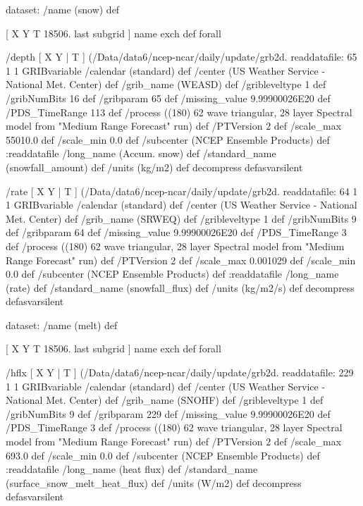 \begin{ingrid}
  dataset: /name (snow) def

   [ X Y T 18506. last subgrid ] { name exch def } forall

    /depth { [ X Y | T ] (/Data/data6/ncep-ncar/daily/update/grb2d.%
    readdatafile:
    65 1 1 GRIBvariable
    /calendar (standard) def
    /center (US Weather Service - National Met. Center) def
    /grib_name (WEASD) def
    /gribleveltype 1 def
    /gribNumBits 16 def
    /gribparam 65 def
    /missing_value 9.99900026E20 def 
    /PDS_TimeRange 113 def
    /process ((180) 62 wave triangular, 28 layer Spectral model from "Medium Range Forecast" run) def
    /PTVersion 2 def
    /scale_max 55010.0 def
    /scale_min 0.0 def
    /subcenter (NCEP Ensemble Products) def
    :readdatafile
    /long_name (Accum. snow) def
    /standard_name (snowfall_amount) def
    /units (kg/m2) def
    decompress
    } defasvarsilent

    /rate { [ X Y | T ] (/Data/data6/ncep-ncar/daily/update/grb2d.%
    readdatafile:
    64 1 1 GRIBvariable
    /calendar (standard) def
    /center (US Weather Service - National Met. Center) def
    /grib_name (SRWEQ) def
    /gribleveltype 1 def
    /gribNumBits 9 def
    /gribparam 64 def
    /missing_value 9.99900026E20 def 
    /PDS_TimeRange 3 def
    /process ((180) 62 wave triangular, 28 layer Spectral model from "Medium Range Forecast" run) def
    /PTVersion 2 def
    /scale_max 0.001029 def
    /scale_min 0.0 def
    /subcenter (NCEP Ensemble Products) def
    :readdatafile
    /long_name (rate) def
    /standard_name (snowfall_flux) def
    /units (kg/m2/s) def
    decompress
    } defasvarsilent

   dataset: /name (melt) def

    [ X Y T 18506. last subgrid ] { name exch def } forall

    /hflx { [ X Y | T ] (/Data/data6/ncep-ncar/daily/update/grb2d.%
    readdatafile:
    229 1 1 GRIBvariable
    /calendar (standard) def
    /center (US Weather Service - National Met. Center) def
    /grib_name (SNOHF) def
    /gribleveltype 1 def
    /gribNumBits 9 def
    /gribparam 229 def
    /missing_value 9.99900026E20 def 
    /PDS_TimeRange 3 def
    /process ((180) 62 wave triangular, 28 layer Spectral model from "Medium Range Forecast" run) def
    /PTVersion 2 def
    /scale_max 693.0 def
    /scale_min 0.0 def
    /subcenter (NCEP Ensemble Products) def
    :readdatafile
    /long_name (heat flux) def
    /standard_name (surface_snow_melt_heat_flux) def
    /units (W/m2) def
    decompress
    } defasvarsilent


\end{ingrid}
